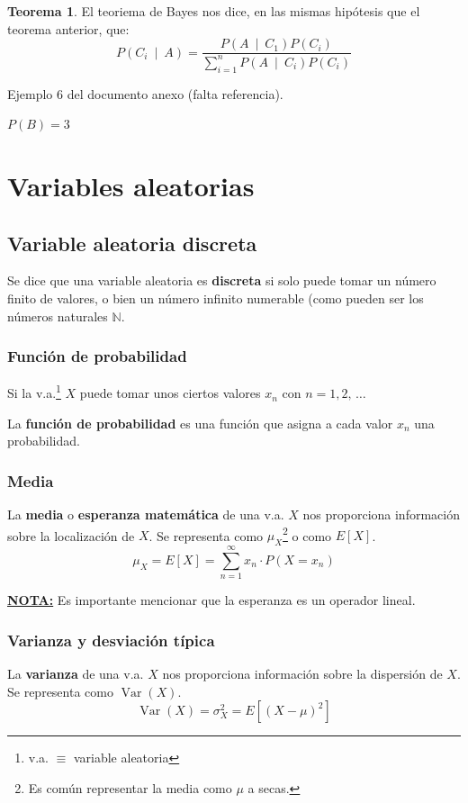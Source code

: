 \documentclass[a4paper]{book}
\numberwithin{figure}{section}
\numberwithin{equation}{subsection}
\numberwithin{figure}{chapter}
\theoremstyle{definition}
\newtheorem{teorema}{Teorema}
\newenvironment{nota}{\underline{\textbf{NOTA:}}}{}
\newcommand{\psus}{\, \ldots \,}
\newcommand{\probCond}[2]{P \left( #1 \: \middle\vert\:  #2 \right) }
\DeclareMathOperator{\Var}{Var}
\begin{document}
\begin{teorema}
	El teoriema de Bayes nos dice, en las mismas hipótesis que el teorema anterior, que: \[\boxed{\probCond{C_i}{A}=\frac{\probCond{A}{C_1}P(C_i)}{\sum^{n}_{i=1}{\probCond{A}{C_i}P(C_i)}}}\]
\end{teorema}

Ejemplo 6 del documento anexo (falta referencia). %

$P(B) = 3$



\chapter{Variables aleatorias}

\section{Variable aleatoria discreta}
Se dice que una variable aleatoria es \textbf{discreta} si solo puede tomar un número finito de valores, o bien un número infinito numerable (como pueden ser los números naturales $\mathbb{N}$.

\subsection{Función de probabilidad}
Si la v.a.\footnote{v.a. $\equiv$ variable aleatoria} $X$ puede tomar unos ciertos valores $x_n$ con $n=1, 2, \psus $

La \textbf{función de probabilidad} es una función que asigna a cada valor $x_n$ una probabilidad.

\subsection{Media}
La \textbf{media} o \textbf{esperanza matemática} de una v.a. $X$ nos proporciona información sobre la localización de $X$. Se representa como $\mu _X$\footnote{Es común representar la media como $\mu$ a secas.} o como $E[X]$.
\[\mu _X = E[X] = \sum^{\infty}_{n=1}{x_n \cdot P(X=x_n)}\]

\begin{nota}
	Es importante mencionar que la esperanza es un operador lineal.
\end{nota}

\subsection{Varianza y desviación típica}
La \textbf{varianza} de una v.a. $X$ nos proporciona información sobre la dispersión de $X$. Se representa como $\Var(X)$.
\[\Var(X) = \sigma_X^2 = E\left[ \left( X-\mu \right)^2 \right]\]
\end{document}

